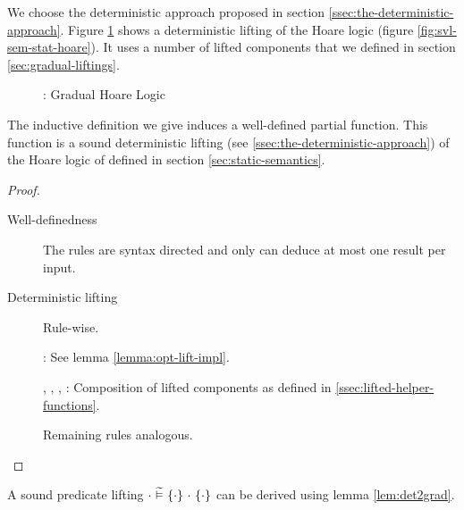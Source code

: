 We choose the deterministic approach proposed in section \ref{ssec:the-deterministic-approach}.
Figure \ref{fig:gvl-sem-stat-hoare} shows a deterministic lifting of the Hoare logic (figure \ref{fig:svl-sem-stat-hoare}).
It uses a number of lifted components that we defined in section \ref{sec:gradual-liftings}.
\begin{figure}[h!]
    
    \caption{\gvl: Gradual Hoare Logic} 
    \label{fig:gvl-sem-stat-hoare}
\end{figure}

\begin{lemma}
    The inductive definition we give induces a well-defined partial function.
    This function is a sound deterministic lifting (see \ref{ssec:the-deterministic-approach}) of the Hoare logic of \svlidf defined in section \ref{sec:static-semantics}.
\end{lemma}
\begin{proof}~
    \begin{description}
        \item[Well-definedness] The rules are syntax directed and only can deduce at most one result per input.
        \item[Deterministic lifting] Rule-wise.
        
        :
        See lemma \ref{lemma:opt-lift-impl}.
        
        , , , :
        Composition of lifted components as defined in \ref{ssec:lifted-helper-functions}.
        
        Remaining rules analogous.
    \end{description}
\end{proof}

A sound predicate lifting ${\cdot} \,\,\widetilde{\vDash}\,\, \{{\cdot}\} ~{\cdot}~ \{{\cdot}\}$ can be derived using lemma \ref{lem:det2grad}.